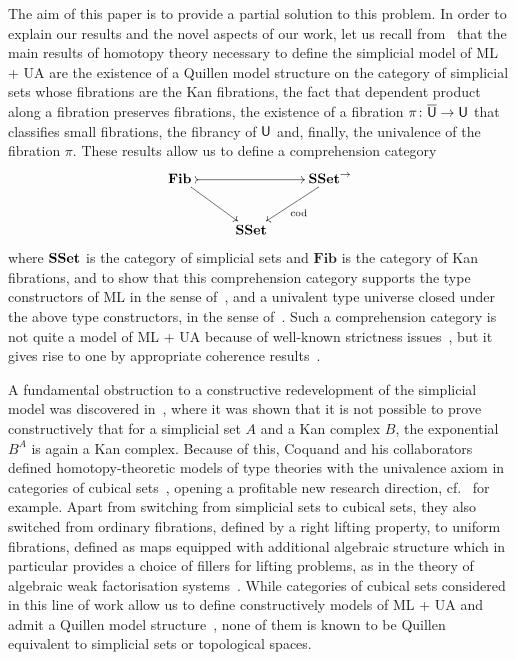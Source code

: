 \documentclass[reqno,10pt,a4paper,oneside,draft]{amsart}
\begin{document}
The aim of this paper is to provide a partial solution to this problem.  In order to
explain our results and the novel aspects of our work, let us recall from~\cite{voevodsky-simplicial-model} that the main results of  homotopy theory necessary 
to define the simplicial model of ML + UA are 
the existence of a Quillen
model structure on the category of simplicial sets whose fibrations are the Kan fibrations, 
 the fact that dependent product along a fibration preserves fibrations,
 the existence of a fibration $\pi \colon \overline{\mathsf{U}} \to \mathsf{U}$ that classifies small fibrations, 
the fibrancy of $\mathsf{U}$ and, finally, the univalence of the fibration $\pi$. These results
allow us to define a comprehension category 
\[
\begin{gathered}
\xymatrix{
\mathbf{Fib}\,  \ar[dr] \ar@{>->}[rr] & & \SSet^{\to} \ar[dl]^{\mathrm{cod}} \\ 
 & \SSet &  }
 \end{gathered}
\]
where $\mathbf{SSet}$ is the category of simplicial sets 
and $\mathbf{Fib}$ is the category of Kan fibrations, 
and to show that this comprehension category supports the type
constructors of ML in the sense of~\cite{LumsdaineP:locuoc},  and a univalent type universe closed under the above type
constructors,  in the sense of~\cite{ShulmanM:allths}. Such a comprehension category is not quite a 
model of ML + UA because of well-known strictness issues~\cite{HofmannM:intttl}, but it gives rise to one
by appropriate coherence results~\cite{voevodsky-simplicial-model,LumsdaineP:locuoc,ShulmanM:allths}.



A fundamental obstruction to a constructive redevelopment of  the simplicial model was discovered in~\cite{coquand-non-constructivity-kan}, where it was shown that
it is not possible to prove constructively that for a simplicial set $A$ and a
Kan complex $B$, the exponential~$B^A$ is again a Kan complex.
Because of this, Coquand and his collaborators  defined homotopy-theoretic models of type
theories with the univalence axiom in categories of cubical sets~\cite{coquand-cubical-sets}, opening a profitable new research direction, cf.~\cite{awodey-cubical,cohen-et-al:cubicaltt,PittsAM:aximct} for example. Apart from switching 
from simplicial sets to cubical sets, they also switched from ordinary fibrations, defined by a right lifting property,
to uniform fibrations, defined as maps equipped with additional algebraic structure which 
in particular provides a choice of fillers for lifting problems, as in the
theory of algebraic weak factorisation systems~\cite{garner:small-object-argument,grandis-tholen-nwfs}. While 
categories of cubical sets considered in this line of work allow us to define constructively models of 
ML + UA and admit a Quillen
model structure~\cite{SattlerC:equepu}, none of them
 is known to be Quillen equivalent to simplicial sets or topological spaces.
\end{document}
